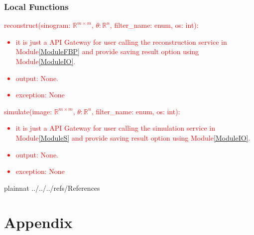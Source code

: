 \documentclass[12pt, titlepage]{article}
\newcommand{\add}{\textcolor{red}}
\begin{document}
\subsubsection{Local Functions}
\noindent
\add{
reconstruct(sinogram: \(\mathbb{R}^{m \times m}\), \(\theta: \mathbb{R}^{n}\), filter\_name: enum, os: int):
\begin{itemize}
\item it is just a API Gateway for user calling the reconstruction service in
  Module\ref{ModuleFBP} and provide saving result option using Module\ref{ModuleIO}.
\item output: None.
\item exception: None
\end{itemize}
}
\noindent
\add{
simulate(image: \(\mathbb{R}^{m \times m}\), \(\theta: \mathbb{R}^{n}\), filter\_name: enum, os: int):
\begin{itemize}
\item it is just a API Gateway for user calling the simulation service in
  Module\ref{ModuleS} and provide saving result option using Module\ref{ModuleIO}.
\item output: None.
\item exception: None
\end{itemize}
}

\newpage

 {plainnat}
 {../../../refs/References}

\newpage

\section{Appendix} \label{Appendix}

\end{document}
